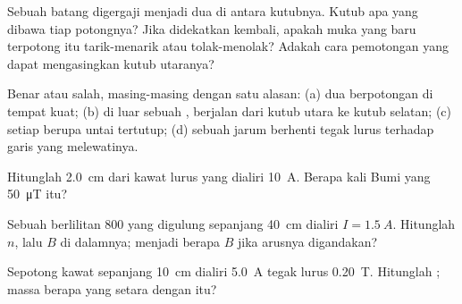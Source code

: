 \begin{exercise}[$\star$]\label{exo:g11:magnetic-fields:1}
Sebuah  batang digergaji menjadi dua di antara kutubnya. Kutub
apa yang dibawa tiap potongnya? Jika didekatkan kembali, apakah muka
yang baru terpotong itu tarik-menarik atau tolak-menolak? Adakah cara
pemotongan yang dapat mengasingkan kutub utaranya?
\end{exercise}

\begin{exercise}[$\star$]\label{exo:g11:magnetic-fields:2}
Benar atau salah, masing-masing dengan satu alasan: (a) dua  berpotongan di tempat  kuat; (b) di luar sebuah ,
 berjalan dari kutub utara ke kutub selatan; (c) setiap
 berupa untai tertutup; (d) sebuah jarum berhenti
tegak lurus terhadap garis yang melewatinya.
\end{exercise}

\begin{exercise}[$\star$]\label{exo:g11:magnetic-fields:3}
Hitunglah  \qty{2.0}{cm} dari kawat lurus yang dialiri
\qty{10}{A}. Berapa kali  Bumi yang \qty{50}{\micro T} itu?
\end{exercise}

\begin{exercise}[$\star$]\label{exo:g11:magnetic-fields:4}
Sebuah  berlilitan $800$ yang digulung sepanjang \qty{40}{cm}
dialiri $I = \qty{1.5}{A}$. Hitunglah $n$, lalu $B$ di dalamnya;
menjadi berapa $B$ jika arusnya digandakan?
\end{exercise}

\begin{exercise}[$\star$]\label{exo:g11:magnetic-fields:5}
Sepotong kawat sepanjang \qty{10}{cm} dialiri \qty{5.0}{A} tegak lurus
 \qty{0.20}{T}. Hitunglah ;  massa berapa
yang setara dengan  itu?
\end{exercise}

